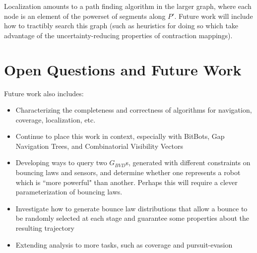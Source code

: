 \documentclass[]{article}  %
\begin{document}
Localization amounts to a path finding algorithm in the larger graph, where each
node is an element of the powerset of segments along $P'$. Future work will
include how to tractibly search this graph (such as heuristics for doing so
which take advantage of the uncertainty-reducing properties of contraction
mappings).


\section{Open Questions and Future Work}

Future work also includes:

\begin{itemize}
\item Characterizing the completeness and correctness of algorithms for
navigation, coverage, localization, etc.
\item Continue to place this work in context, especially with BitBots, Gap
Navigation Trees, and Combinatorial Visibility Vectors
\item Developing ways to query two $G_{BVD}$s, generated with different constraints on
 bouncing laws and sensors, and determine whether one represents a robot which
is ``more powerful" than another. Perhaps this will require a clever
parameterization of bouncing laws.
\item Investigate how to generate bounce law distributions that allow a bounce
to be randomly selected at each stage and guarantee some properties about the
resulting trajectory
\item Extending analysis to more tasks, such as coverage and pursuit-evasion
\end{itemize}




\fi



\end{document}
